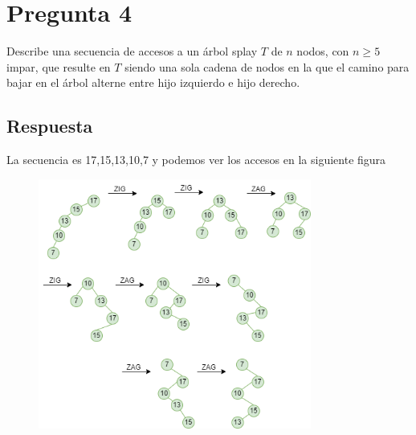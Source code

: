 \section*{Pregunta 4}
\noindent Describe una secuencia de accesos a un árbol splay $T$ de $n$ nodos, con $n \geq 5$ impar, que resulte en $T$ siendo una sola cadena de nodos en la que el camino para bajar en el árbol alterne entre hijo izquierdo e hijo derecho.

\subsection*{Respuesta}

La secuencia es 17,15,13,10,7 y podemos ver los accesos en la siguiente figura

\newpage
\begin{figure}[!h]
    \centering
    \includegraphics[width=0.8\textwidth]{t1-4.png}
\end{figure}

\bigskip
